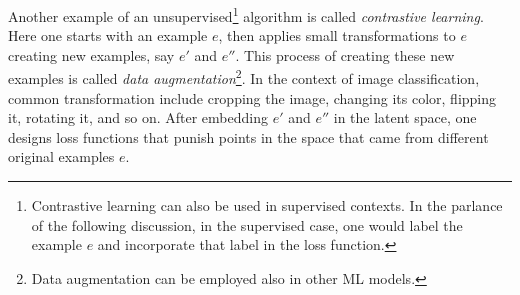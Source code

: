 Another example of an unsupervised\footnote{Contrastive learning can also
be used in supervised contexts. In the parlance of the following discussion,
in the supervised case, one would label the example $e$ and incorporate
that label in the loss function.} algorithm is called {\it contrastive
learning}. Here one starts with an example $e$,
then applies small transformations to $e$ creating new examples, say $e'$ and
$e''$. This process of creating these new examples is called {\it data
augmentation}\footnote{Data augmentation can be
employed also in other ML models.}. 
In the context of image classification,
common transformation include cropping the image, changing its color, flipping
it, rotating it, and so on. 
After embedding $e'$ and $e''$ in the latent space, one designs loss functions
that punish points in the space that came from different original examples $e$.




